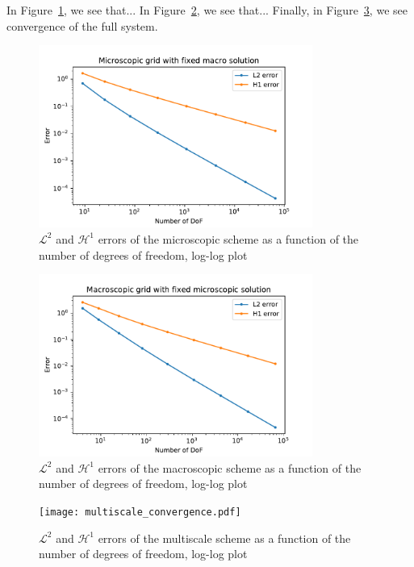 \documentclass{article}
\renewcommand{\L}{\mathcal{ L}}
\renewcommand{\H}{\mathcal{ H}}
\begin{document}
In Figure~\ref{fig:micro_convergence}, we see that...
In Figure~\ref{fig:macro_convergence}, we see that...
Finally, in Figure~\ref{fig:multiscale_convergence}, we see convergence of the full system.

\begin{figure}[ht]
    \includegraphics[width=0.8\textwidth]{micro_convergence.pdf}
    \caption{$\L^2$ and $\H^1$ errors of the microscopic scheme as a function of the number of degrees of freedom, log-log plot}
    \label{fig:micro_convergence}
\end{figure}

\begin{figure}[ht]
    \includegraphics[width=0.8\textwidth]{macro_convergence.pdf}
    \caption{$\L^2$ and $\H^1$ errors of the macroscopic scheme as a function of the number of degrees of freedom, log-log plot}
    \label{fig:macro_convergence}
\end{figure}

\begin{figure}[ht]
    \texttt{[image: multiscale\_convergence.pdf]}
    \caption{$\L^2$ and $\H^1$ errors of the multiscale scheme as a function of the number of degrees of freedom, log-log plot}
    \label{fig:multiscale_convergence}
\end{figure}
\end{document}
